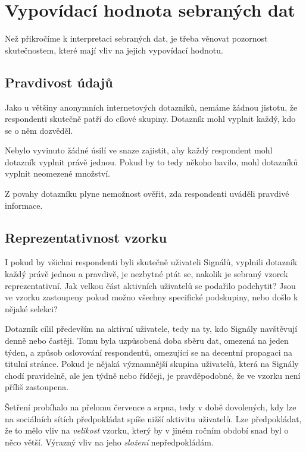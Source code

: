 \section{Vypovídací hodnota sebraných dat}

Než přikročíme k interpretaci sebraných dat, je třeba věnovat
pozornost skutečnostem, které mají vliv na jejich vypovídací
hodnotu.

\subsection{Pravdivost údajů}

Jako u většiny anonymních internetových dotazníků,
nemáme žádnou jistotu, že respondenti skutečně patří do cílové
skupiny. Dotazník mohl vyplnit každý, kdo se o něm dozvěděl.

Nebylo vyvinuto žádné úsilí ve snaze zajistit, aby každý
respondent mohl dotazník vyplnit právě jednou.
Pokud by to tedy někoho bavilo, mohl dotazníků vyplnit
neomezené množství.

Z povahy dotazníku plyne nemožnost ověřit, zda respondenti
uváděli pravdivé informace.

\subsection{Reprezentativnost vzorku}

I pokud by všichni respondenti byli skutečně uživateli Signálů,
vyplnili dotazník každý právě jednou a pravdivě,
je nezbytné ptát se, nakolik je sebraný vzorek reprezentativní.
Jak velkou část aktivních uživatelů se podařilo podchytit?
Jsou ve vzorku zastoupeny pokud možno všechny specifické
podskupiny, nebo došlo k nějaké selekci?

Dotazník cílil především na aktivní uživatele, tedy na ty,
kdo Signály navštěvují denně nebo častěji. Tomu byla uzpůsobená
doba sběru dat, omezená na jeden týden,
a způsob oslovování respondentů, omezující se na
decentní propagaci na titulní stránce.
Pokud je nějaká významnější skupina uživatelů, která na Signály
chodí pravidelně, ale jen týdně nebo řídčeji, je pravděpodobné,
že ve vzorku není příliš zastoupena.

Šetření probíhalo na přelomu července a srpna, tedy v době
dovolených, kdy lze na sociálních sítích předpokládat spíše
nižší aktivitu uživatelů.
Lze předpokládat, že to mělo vliv na \emph{velikost} vzorku,
který by v jiném ročním období snad byl o něco větší.
Výrazný vliv na jeho \emph{složení} nepředpokládám.

